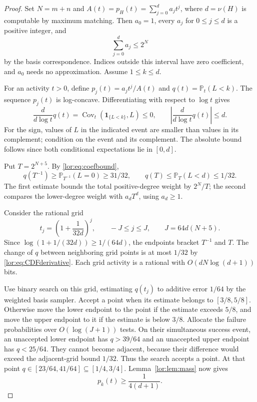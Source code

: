 \documentclass[11pt]{article}
\numberwithin{equation}{section}
\theoremstyle{definition}
\newcommand{\PP}{\mathbb P}
\newcommand{\ind}{\mathbf 1}
\newcommand{\Cov}{\operatorname{Cov}}
\begin{document}
\begin{proof}
Set $N=m+n$ and $A(t)=p_H(t)=\sum_{j=0}^da_jt^j$, where $d=\nu(H)$ is
computable by maximum matching. Then $a_0=1$, every $a_j$ for $0\le j\le d$
is a positive integer, and
\begin{equation}
 \sum_{j=0}^d a_j\le2^N
 \label{lor:eq:coefbound}
\end{equation}
by the basis correspondence. Indices outside this interval have zero
coefficient, and $a_0$ needs no approximation. Assume $1\le k\le d$.

For an activity $t>0$, define
$p_j(t)=a_jt^j/A(t)$ and $q(t)=\PP_t(L<k)$.
The sequence $p_j(t)$ is log-concave. Differentiating with respect to
$\log t$ gives
\begin{equation}
 \frac{d}{d\log t}q(t)=\Cov_t(\ind_{\{L<k\}},L)\le0,
 \qquad \left|\frac{d}{d\log t}q(t)\right|\le d.
 \label{lor:eq:CDFderivative}
\end{equation}
For the sign, values of $L$ in the indicated event are smaller than values
in its complement; condition on the event and its complement. The absolute
bound follows since both conditional expectations lie in $[0,d]$.

Put $T=2^{N+5}$. By \eqref{lor:eq:coefbound},
\[
 q(T^{-1})\ge\PP_{T^{-1}}(L=0)\ge31/32,
 \qquad q(T)\le\PP_T(L<d)\le1/32.
\]
The first estimate bounds the total positive-degree weight by $2^N/T$;
the second compares the lower-degree weight with $a_dT^d$, using $a_d\ge1$.

Consider the rational grid
\begin{equation}
 t_j=\left(1+\frac1{32d}\right)^j,
 \qquad -J\le j\le J,
 \qquad J=64d(N+5).
 \label{lor:eq:grid}
\end{equation}
Since $\log(1+1/(32d))\ge1/(64d)$, the endpoints bracket $T^{-1}$ and $T$.
The change of $q$ between neighboring grid points is at most $1/32$ by
\eqref{lor:eq:CDFderivative}. Each grid activity is a rational with
$O(dN\log(d+1))$ bits.

Use binary search on this grid, estimating $q(t_j)$ to additive error
$1/64$ by the weighted basis sampler. Accept a point when its estimate
belongs to $[3/8,5/8]$. Otherwise move the lower endpoint to the point if
the estimate exceeds $5/8$, and move the upper endpoint to it if the
estimate is below $3/8$. Allocate the failure probabilities over
$O(\log(J+1))$ tests. On their simultaneous success event, an unaccepted
lower endpoint has $q>39/64$ and an unaccepted upper endpoint has
$q<25/64$. They cannot become adjacent, because their difference would
exceed the adjacent-grid bound $1/32$. Thus the search accepts a point.
At that point $q\in[23/64,41/64]\subseteq[1/4,3/4]$.
Lemma~\ref{lor:lem:mass} now gives
\begin{equation}
 p_k(t)\ge\frac1{4(d+1)}.
 \label{lor:eq:pkbound}
\end{equation}


\end{proof}
\end{document}
